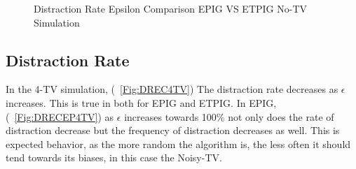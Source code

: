 \documentclass[12pt]{thesis}
\begin{document}
\begin{figure}	
	\begin{center}
		\hfill
		
		\hfill
	\end{center}	
	\caption{Distraction Rate Epsilon Comparison EPIG VS ETPIG No-TV Simulation}
	\label{Fig:DREC0TV}
\end{figure}


\subsection{Distraction Rate}
In the 4-TV simulation, (\figurename~\ref{Fig:DREC4TV}) The distraction rate decreases as $\epsilon$ increases. This is true in both for EPIG and ETPIG. In EPIG, (\figurename~\ref{Fig:DRECEP4TV}) as $\epsilon$ increases towards 100\% not only does the rate of distraction decrease but the frequency of distraction decreases as well. This is expected behavior, as the more random the algorithm is, the less often it should tend towards its biases, in this case the Noisy-TV.
\end{document}
